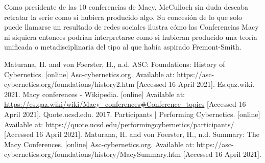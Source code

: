\documentclass[11pt]{article}
\begin{document}
		Como presidente de las 10 conferencias de Macy, McCulloch sin duda deseaba retratar la serie como si hubiera producido algo. Su concesión de lo que solo puede llamarse un resultado de redes sociales ilustra cómo las Conferencias Macy ni siquiera entonces podrían interpretarse como si hubieran producido una teoría unificada o metadisciplinaria del tipo al que había aspirado Fremont-Smith.
	\begin{thebibliography}{1}
  Maturana, H. and von Foerster, H., n.d. ASC: Foundations: History of Cybernetics. [online] Asc-cybernetics.org. Available at: https://asc-cybernetics.org/foundations/history2.htm [Accessed 16 April 2021].	
  Es.qaz.wiki. 2021. Macy conferences - Wikipedia. [online] Available at: \url{https://es.qaz.wiki/wiki/Macy_conferences#Conference_topics} [Accessed 16 April 2021].
  Quote.ucsd.edu. 2017. Participants | Performing Cybernetics. [online] Available at: https://quote.ucsd.edu/performingcybernetics/participants/ [Accessed 16 April 2021].
  Maturana, H. and von Foerster, H., n.d. Summary: The Macy Conferences. [online] Asc-cybernetics.org. Available at: https://asc-cybernetics.org/foundations/history/MacySummary.htm [Accessed 16 April 2021].
\end{thebibliography}
\end{document}
